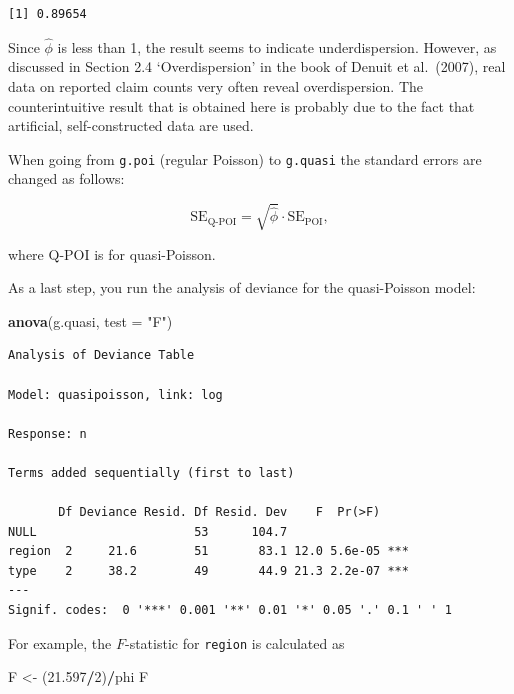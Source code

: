 \documentclass[
]{book}
\newenvironment{Shaded}{\begin{snugshade}}{\end{snugshade}}
\newcommand{\DataTypeTok}[1]{\textcolor[rgb]{0.13,0.29,0.53}{#1}}
\newcommand{\DecValTok}[1]{\textcolor[rgb]{0.00,0.00,0.81}{#1}}
\newcommand{\FloatTok}[1]{\textcolor[rgb]{0.00,0.00,0.81}{#1}}
\newcommand{\KeywordTok}[1]{\textcolor[rgb]{0.13,0.29,0.53}{\textbf{#1}}}
\newcommand{\NormalTok}[1]{#1}
\newcommand{\OperatorTok}[1]{\textcolor[rgb]{0.81,0.36,0.00}{\textbf{#1}}}
\newcommand{\StringTok}[1]{\textcolor[rgb]{0.31,0.60,0.02}{#1}}
\begin{document}
\begin{verbatim}
[1] 0.89654
\end{verbatim}

Since \(\hat{\phi}\) is less than 1, the result seems to indicate underdispersion. However, as discussed in Section 2.4 `Overdispersion' in the book of Denuit et al.~(2007), real data on reported claim counts very often reveal overdispersion. The counterintuitive result that is obtained here is probably due to the fact that artificial, self-constructed data are used.

When going from \texttt{g.poi} (regular Poisson) to \texttt{g.quasi} the standard errors are changed as follows:

\[ \text{SE}_{\text{Q-POI}} = \sqrt{\hat{\phi}} \cdot \text{SE}_{\text{POI}},\]

where \(\text{Q-POI}\) is for quasi-Poisson.

As a last step, you run the analysis of deviance for the quasi-Poisson model:

\begin{Shaded}
\begin{Highlighting}[]
\KeywordTok{anova}\NormalTok{(g.quasi, }\DataTypeTok{test =} \StringTok{"F"}\NormalTok{)}
\end{Highlighting}
\end{Shaded}

\begin{verbatim}
Analysis of Deviance Table

Model: quasipoisson, link: log

Response: n

Terms added sequentially (first to last)

       Df Deviance Resid. Df Resid. Dev    F  Pr(>F)    
NULL                      53      104.7                 
region  2     21.6        51       83.1 12.0 5.6e-05 ***
type    2     38.2        49       44.9 21.3 2.2e-07 ***
---
Signif. codes:  0 '***' 0.001 '**' 0.01 '*' 0.05 '.' 0.1 ' ' 1
\end{verbatim}

For example, the \(F\)-statistic for \texttt{region} is calculated as

\begin{Shaded}
\begin{Highlighting}[]
\NormalTok{F <-}\StringTok{ }\NormalTok{(}\FloatTok{21.597}\OperatorTok{/}\DecValTok{2}\NormalTok{)}\OperatorTok{/}\NormalTok{phi}
\NormalTok{F}
\end{Highlighting}
\end{Shaded}
\end{document}
